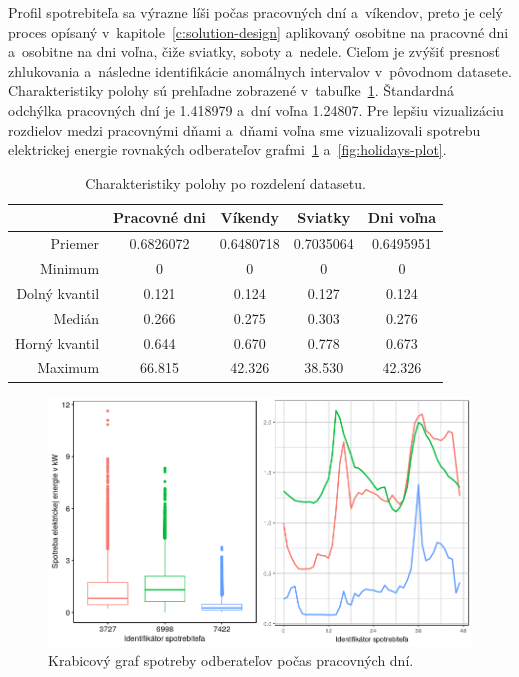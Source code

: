 \documentclass[a4paper,twoside,slovak,12pt,appendix]{article}
\begin{document}
\noindent
Profil spotrebiteľa sa výrazne líši počas pracovných dní a~víkendov, preto je
celý proces opísaný v~kapitole~\ref{c:solution-design} aplikovaný osobitne na
pracovné dni a~osobitne na dni voľna, čiže sviatky, soboty a~nedele. Cieľom je
zvýšiť presnosť zhlukovania a~následne identifikácie anomálnych intervalov
v~pôvodnom datasete. Charakteristiky polohy sú prehľadne zobrazené
v~tabuľke~\ref{tab:dataset-statistics}. Štandardná odchýlka pracovných dní je
1.418979 a~dní voľna 1.24807. Pre lepšiu vizualizáciu rozdielov medzi pracovnými
dňami a~dňami voľna sme vizualizovali spotrebu elektrickej energie rovnakých
odberateľov grafmi~\ref{fig:workdays-plot} a~\ref{fig:holidays-plot}.

\begin{table}[ht]
  \centering
  \caption{Charakteristiky polohy po rozdelení datasetu.}
  \label{tab:dataset-statistics}
  \begin{tabular}{|r|c|c|c|c|}
    \hline
					&  \textbf{Pracovné dni}  &	\textbf{Víkendy}	&	\textbf{Sviatky}	&	\textbf{Dni voľna} 	\\ \hline
		Priemer				&		0.6826072			&		0.6480718				&		0.7035064				&		0.6495951				 	\\ \hline
		Minimum				&		0							&		0								&		0								&		0								 	\\ \hline
		Dolný kvantil	&		0.121					&		0.124						&		0.127						&		0.124							\\ \hline
		Medián				&		0.266					&		0.275						&		0.303						&		0.276							\\ \hline
		Horný kvantil	&		0.644					&		0.670						&		0.778						&		0.673							\\ \hline
		Maximum				&		66.815				&		42.326					&		38.530					&		42.326						\\ \hline
  \end{tabular}
\end{table}

\begin{figure}[htbp]
  \centering
  \includegraphics[width=\textwidth]{workdays_plot.png}
  \caption{Krabicový graf spotreby odberateľov počas pracovných dní.}
  \label{fig:workdays-plot}
\end{figure}
\end{document}
